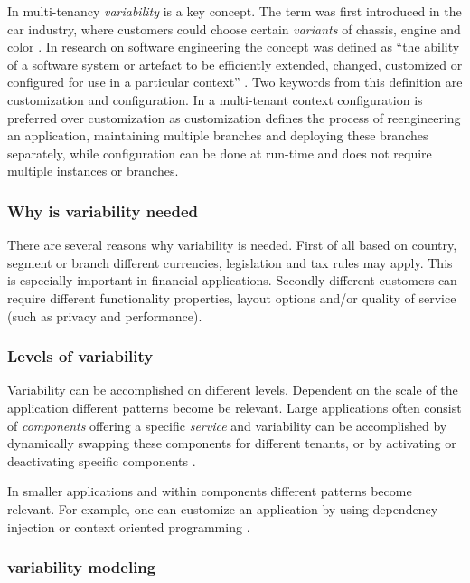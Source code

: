 In multi-tenancy \textit{variability} is a key concept. The term was first introduced in the car industry, where customers could choose certain \textit{variants} of chassis, engine and color \cite[p. 153]{kabbedijk2011variability}. 
In research on software engineering the concept was defined as ``the ability of a software system or artefact to be efficiently extended, changed, customized or configured for use in a particular context'' \cite{svahnberg2005taxonomy}.
Two keywords from this definition are customization and configuration. In a multi-tenant context configuration is preferred over customization \cite{sun2008software} as customization defines the process of reengineering an application, maintaining multiple branches and deploying these branches separately, while configuration can be done at run-time and does not require multiple instances or branches.

\subsubsection{Why is variability needed}
There are several reasons why variability is needed. 
First of all based on country, segment or branch different currencies, legislation and tax rules may apply. This is especially important in financial applications. 
Secondly different customers can require different functionality properties, layout options and/or quality of service (such as privacy and performance).

\subsubsection{Levels of variability}
Variability can be accomplished on different levels. 
Dependent on the scale of the application different patterns become be relevant. Large applications often consist of \textit{components} offering a specific \textit{service} and variability can be accomplished by dynamically swapping these components for different tenants, or by activating or deactivating specific components \cite{mietzner2008defining}. 

In smaller applications and within components different patterns become relevant. For example, one can customize an application by using dependency injection \cite{walraven2011middleware} or context oriented programming \cite{truyen2012context}.


\subsubsection{variability modeling}

